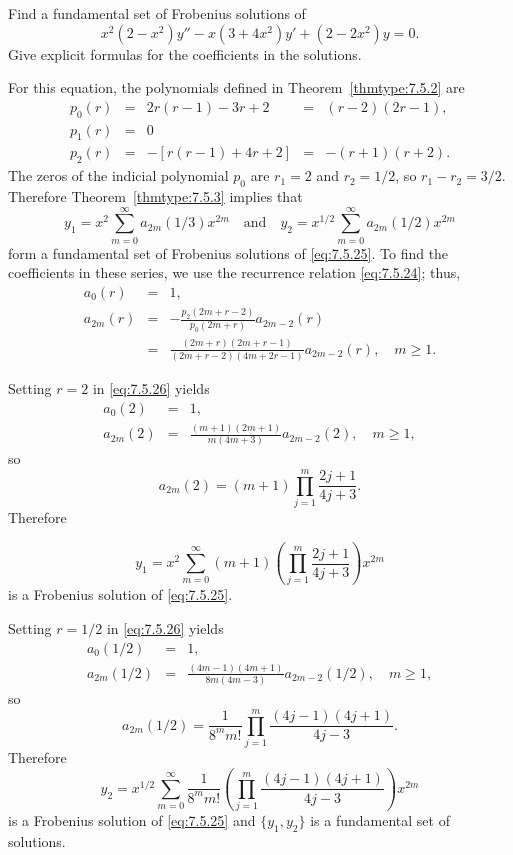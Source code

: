 \documentclass{ximera}
\begin{document}
\begin{example}\label{example:7.5.3}
Find a fundamental set of   Frobenius solutions of
\begin{equation} \label{eq:7.5.25}
x^2(2-x^2)y''-x(3+4x^2)y'+(2-2x^2)y=0.
\end{equation}
Give explicit  formulas for the coefficients in the solutions.

\begin{explanation}
For  this equation,  the polynomials defined in
Theorem~\ref{thmtype:7.5.2} are
$$
\begin{array}{ccccc}
p_0(r)&=&2r(r-1)-3r+2&=&(r-2)(2r-1),\\
p_1(r)&=&0\\
p_2(r)&=&-\left[r(r-1)+4r+2\right]&=&-(r+1)(r+2).
\end{array}
$$
The zeros of the indicial polynomial $p_0$ are $r_1=2$
and $r_2=1/2$, so  $r_1-r_2=3/2$. Therefore
Theorem~\ref{thmtype:7.5.3} implies that
$$
y_1=x^2\sum_{m=0}^\infty a_{2m}(1/3)x^{2m}\quad\mbox{and}\quad
y_2=x^{1/2}\sum_{m=0}^\infty a_{2m}(1/2)x^{2m}
$$
form a fundamental set of  Frobenius solutions of \eqref{eq:7.5.25}.
To find the coefficients in these series, we use the recurrence
relation \eqref{eq:7.5.24};   thus,
\begin{equation} \label{eq:7.5.26}
\begin{array}{ccl}
a_0(r)&=&1,\\
a_{2m}(r)&=&-\frac{p_2(2m+r-2)}{p_0(2m+r)}a_{2m-2}(r)\\
&=&\frac{(2m+r)(2m+r-1)}{(2m+r-2)(4m+2r-1)}a_{2m-2}(r),\quad m\geq1.
\end{array}
\end{equation}

Setting $r=2$ in \eqref{eq:7.5.26} yields
\begin{eqnarray*}
a_0(2)&=&1,\\
a_{2m}(2)&=&\frac{(m+1)(2m+1)}{m(4m+3)}a_{2m-2}(2),\quad m\geq1,
\end{eqnarray*}
so
$$
a_{2m}(2)=(m+1)\prod_{j=1}^m\frac{2j+1}{4j+3}.
$$
Therefore

$$
 y_1=x^2\sum_{m=0}^\infty
(m+1)\left(\prod_{j=1}^m\frac{2j+1}{4j+3}\right)x^{2m}
$$
is a Frobenius solution of \eqref{eq:7.5.25}.


Setting $r=1/2$ in \eqref{eq:7.5.26} yields
\begin{eqnarray*}
a_0(1/2)&=&1,\\
a_{2m}(1/2)&=&\frac{(4m-1)(4m+1)}{8m(4m-3)}a_{2m-2}(1/2),\quad
m\geq1,
\end{eqnarray*}
so
$$
a_{2m}(1/2)=\frac{1}{8^mm!}\prod_{j=1}^m\frac{(4j-1)(4j+1)}{4j-3}.
$$
Therefore
$$
y_2=x^{1/2}\sum_{m=0}^\infty
\frac{1}{8^mm!}\left(\prod_{j=1}^m\frac{(4j-1)(4j+1)}{4j-3}\right)x^{2m}
$$
is a Frobenius solution of \eqref{eq:7.5.25} and $\{y_1,y_2\}$ is a
fundamental set of solutions.
\end{explanation}
\end{example}
\end{document}

